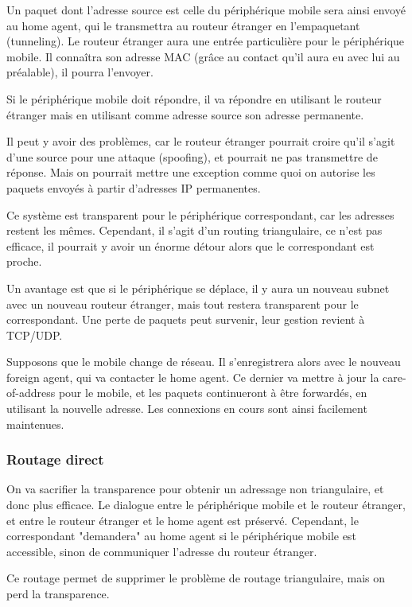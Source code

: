 		Un paquet dont l'adresse source est celle du périphérique mobile sera ainsi envoyé au home agent, qui le transmettra au routeur étranger en l'empaquetant (tunneling). Le routeur étranger aura une entrée particulière pour le périphérique mobile. Il connaîtra son adresse MAC (grâce au contact qu'il aura eu avec lui au préalable), il pourra l'envoyer.
  
		Si le périphérique mobile doit répondre, il va répondre en utilisant le routeur étranger mais en utilisant comme adresse source son adresse permanente. 
	
		Il peut y avoir des problèmes, car le routeur étranger pourrait croire qu'il s'agit d'une source pour une attaque (spoofing), et pourrait ne pas transmettre de réponse. Mais on pourrait mettre une exception comme quoi on autorise les paquets envoyés à partir d'adresses IP permanentes.
  
		Ce système est transparent pour le périphérique correspondant, car les adresses restent les mêmes. Cependant, il s'agit d'un routing triangulaire, ce n'est pas efficace, il pourrait y avoir un énorme détour alors que le correspondant est proche.
  
		Un avantage est que si le périphérique se déplace, il y aura un nouveau subnet avec un nouveau routeur étranger, mais tout restera transparent pour le correspondant. Une perte de paquets peut survenir, leur gestion revient à TCP/UDP.
		
		Supposons que le mobile change de réseau. Il s'enregistrera alors avec le nouveau foreign agent, qui va contacter le home agent. Ce dernier va mettre à jour la care-of-address pour le mobile, et les paquets continueront à être forwardés, en utilisant la nouvelle adresse. Les connexions en cours sont ainsi facilement maintenues.
	
		\subsubsection{Routage direct}
  
		On va sacrifier la transparence pour obtenir un adressage non triangulaire, et donc plus efficace. Le dialogue entre le périphérique mobile et le routeur étranger, et entre le routeur étranger et le home agent est préservé. Cependant, le correspondant "demandera" au home agent si le périphérique mobile est accessible, sinon de communiquer l'adresse du routeur étranger.
  
 		
 		Ce routage permet de supprimer le problème de routage triangulaire, mais on perd la transparence.
 		
